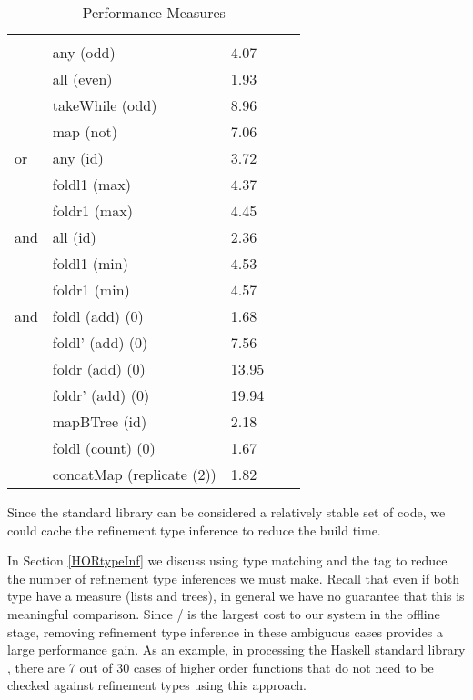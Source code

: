 \begin{table}[]
\centering
\caption{Performance Measures}
\label{my-label}
\begin{tabular}{lllll}
 &  &  &  &  \\
 & any (odd)        & 4.07   &  &  \\
 \hline

 & all (even)       & 1.93   &  &  \\
 \hline

 & takeWhile (odd)  & 8.96   &  &  \\
 \hline

 & map (not)        & 7.06   &  &  \\
 \hline

or  & any (id)      & 3.72   &  &  \\
    & foldl1 (max)  & 4.37   &  &  \\
    & foldr1 (max)  & 4.45   &  &  \\
 \hline

and & all (id)      & 2.36   &  &  \\
    & foldl1 (min)  & 4.53   &  &  \\
    & foldr1 (min)  & 4.57   &  &  \\
 \hline

and & foldl  (add) (0)   & 1.68   &  &  \\
    & foldl' (add) (0)   & 7.56   &  &  \\
    & foldr  (add) (0)   & 13.95  &  &  \\
    & foldr' (add) (0)   & 19.94  &  &  \\
\hline

    & mapBTree (id)      & 2.18   &  &  \\
\hline

    & foldl (count) (0)  & 1.67   &  &  \\
    \hline

    &  concatMap (replicate (2))  & 1.82   &  &  \\
\end{tabular}
\end{table}

Since the standard library can be considered a relatively stable set of code, we could cache the refinement type inference to reduce the build time.

In Section \ref{HORtypeInf} we discuss using type matching and the  tag to reduce the number of refinement type inferences we must make. 
Recall that even if both type have a measure (lists and trees), in general we have no guarantee that this is meaningful comparison.
Since \lhask/ is the largest cost to our system in the offline stage, removing refinement type inference in these ambiguous cases provides a large performance gain.
As an example, in processing the Haskell standard library , there are 7 out of 30 cases of higher order functions that do not need to be checked against refinement types using this approach.

